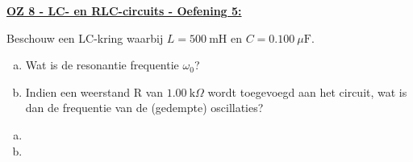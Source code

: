 \textbf{\underline{OZ 8 - LC- en  RLC-circuits - Oefening 5:}}
\vspace{0.5cm}

Beschouw een LC-kring waarbij $L = 500 \ \text{mH}$ en $C = 0.100 \ \mu \text{F}$. 

\begin{enumerate}[(a)]
    \item 
        Wat is de resonantie frequentie $\omega_0$?
    \item 
        Indien een weerstand R van $1.00 \ \text{k}\Omega$ wordt toegevoegd aan het circuit, wat is dan de frequentie van de (gedempte) oscillaties?
\end{enumerate}

\begin{enumerate}[(a)]
    \item 
        \begin{description}[labelwidth=1.5cm, leftmargin=!]
            \item[Geg. :]   
            \item[Gevr. :] 
            \item[Opl. :]   
        \end{description}
    \item 
        \begin{description}[labelwidth=1.5cm, leftmargin=!]
            \item[Geg. :]   
            \item[Gevr. :] 
            \item[Opl. :]   
        \end{description}
\end{enumerate}

\vspace{1cm}